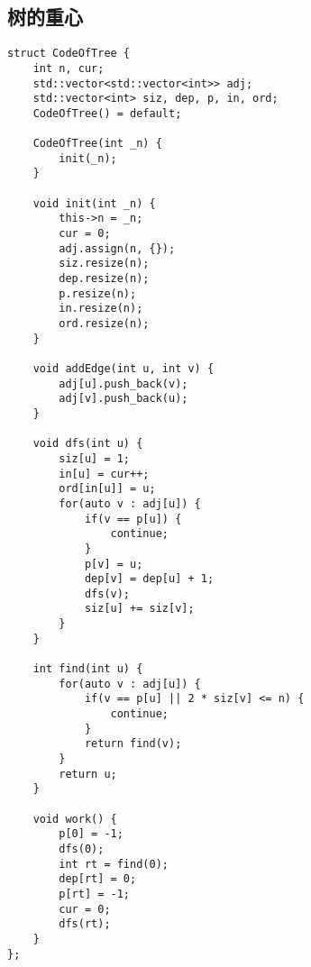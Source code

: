 \subsection{树的重心}
\begin{lstlisting}
struct CodeOfTree {
    int n, cur;
    std::vector<std::vector<int>> adj;
    std::vector<int> siz, dep, p, in, ord;
    CodeOfTree() = default;

    CodeOfTree(int _n) {
        init(_n);
    }

    void init(int _n) {
        this->n = _n;
        cur = 0;
        adj.assign(n, {});
        siz.resize(n);
        dep.resize(n);
        p.resize(n);
        in.resize(n);
        ord.resize(n);
    }

    void addEdge(int u, int v) {
        adj[u].push_back(v);
        adj[v].push_back(u);
    }

    void dfs(int u) {
        siz[u] = 1;
        in[u] = cur++;
        ord[in[u]] = u;
        for(auto v : adj[u]) {
            if(v == p[u]) {
                continue;
            }
            p[v] = u;
            dep[v] = dep[u] + 1;
            dfs(v);
            siz[u] += siz[v];
        }
    }

    int find(int u) {
        for(auto v : adj[u]) {
            if(v == p[u] || 2 * siz[v] <= n) {
                continue;
            }
            return find(v);
        }
        return u;
    }

    void work() {
        p[0] = -1;
        dfs(0);
        int rt = find(0);
        dep[rt] = 0;
        p[rt] = -1;
        cur = 0;
        dfs(rt);
    }
};
\end{lstlisting}



